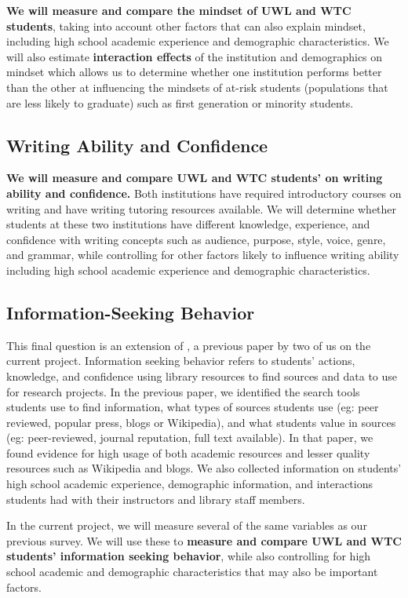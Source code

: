 \documentclass[11pt]{article}
\newcommand{\citee}[1]{\citet*{#1}}
\begin{document}
\textbf{We will measure and compare the mindset of UWL and WTC students}, taking into account other factors that can also explain mindset, including high school academic experience and demographic characteristics.  We will also estimate \textbf{interaction effects} of the institution and demographics on mindset which allows us to determine whether one institution performs better than the other at influencing the mindsets of at-risk students (populations that are less likely to graduate) such as first generation or minority students.

\subsection{Writing Ability and Confidence}

\textbf{We will measure and compare UWL and WTC students' on writing ability and confidence.}  Both institutions have required introductory courses on writing and have writing tutoring resources available.  We will determine whether students at these two institutions have different knowledge, experience, and confidence with writing concepts such as audience, purpose, style, voice, genre, and grammar, while controlling for other factors likely to influence writing ability including high school academic experience and demographic characteristics. 

\subsection{Information-Seeking Behavior}

This final question is an extension of \citee{km2016}, a previous paper by two of us on the current project.  Information seeking behavior refers to students' actions, knowledge, and confidence using library resources to find sources and data to use for research projects.  In the previous paper, we identified the search tools students use to find information, what types of sources students use (eg: peer reviewed, popular press, blogs or Wikipedia), and what students value in sources (eg: peer-reviewed, journal reputation, full text available).  In that paper, we found evidence for high usage of both academic resources and lesser quality resources such as Wikipedia and blogs.  We also collected information on students' high school academic experience, demographic information, and interactions students had with their instructors and library staff members.

In the current project, we will measure several of the same variables as our previous survey.  We will use these to \textbf{measure and compare UWL and WTC students' information seeking behavior}, while also controlling for high school academic and demographic characteristics that may also be important factors.
\end{document}
